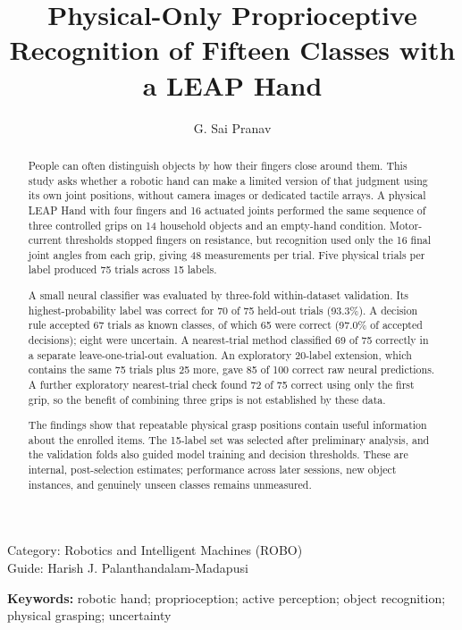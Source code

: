 \documentclass[12pt,a4paper]{article}
\title{Physical-Only Proprioceptive Recognition of Fifteen Classes with a LEAP Hand}
\author{G. Sai Pranav}
\date{}
\begin{document}
\maketitle
\vspace{-1.2em}
\begin{center}
\small Category: Robotics and Intelligent Machines (ROBO)\\
Guide: Harish J. Palanthandalam-Madapusi
\end{center}

\begin{abstract}
People can often distinguish objects by how their fingers close around them. This study asks whether a robotic hand can make a limited version of that judgment using its own joint positions, without camera images or dedicated tactile arrays. A physical LEAP Hand with four fingers and 16 actuated joints performed the same sequence of three controlled grips on 14 household objects and an empty-hand condition. Motor-current thresholds stopped fingers on resistance, but recognition used only the 16 final joint angles from each grip, giving 48 measurements per trial. Five physical trials per label produced 75 trials across 15 labels.

A small neural classifier was evaluated by three-fold within-dataset validation. Its highest-probability label was correct for 70 of 75 held-out trials (93.3\%). A decision rule accepted 67 trials as known classes, of which 65 were correct (97.0\% of accepted decisions); eight were uncertain. A nearest-trial method classified 69 of 75 correctly in a separate leave-one-trial-out evaluation. An exploratory 20-label extension, which contains the same 75 trials plus 25 more, gave 85 of 100 correct raw neural predictions. A further exploratory nearest-trial check found 72 of 75 correct using only the first grip, so the benefit of combining three grips is not established by these data.

The findings show that repeatable physical grasp positions contain useful information about the enrolled items. The 15-label set was selected after preliminary analysis, and the validation folds also guided model training and decision thresholds. These are internal, post-selection estimates; performance across later sessions, new object instances, and genuinely unseen classes remains unmeasured.
\end{abstract}

\noindent\textbf{Keywords:} robotic hand; proprioception; active perception; object recognition; physical grasping; uncertainty
\end{document}
